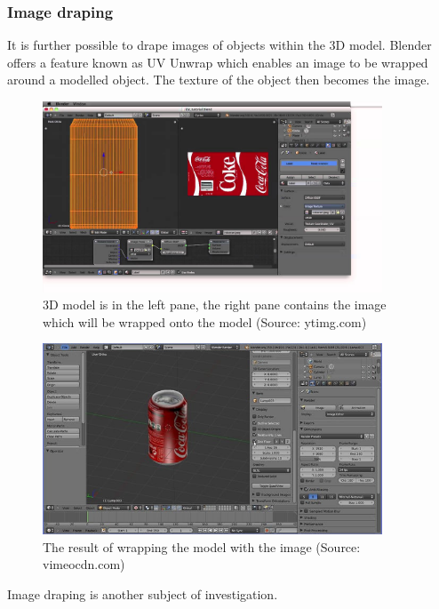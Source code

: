 \documentclass[11pt,a4paper]{report}
\begin{document}
			\subsubsection{Image draping}
				It is further possible to drape images of objects within the 3D model. Blender offers a feature known as UV Unwrap which enables an image to be wrapped around a modelled object. The texture of the object then becomes the image.
				
				\begin{figure}[H]
					\centering
					\includegraphics[width=0.9\textwidth]{blender_uv_unwrap_1}
					\caption{3D model is in the left pane, the right pane contains the image which will be wrapped onto the model (Source: ytimg.com)}
					\label{fig:blender_uv_unwrap_1}
				\end{figure}
				
				\begin{figure}[H]
					\centering
					\includegraphics[width=0.9\textwidth]{blender_uv_unwrap_2}
					\caption{The result of wrapping the model with the image (Source: vimeocdn.com)}
					\label{fig:blender_uv_unwrap_2}
				\end{figure}
				
				Image draping is another subject of investigation.
				
\end{document}

